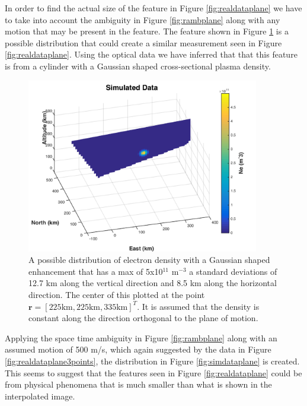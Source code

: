In order to find the actual size of the feature in Figure \ref{fig:realdataplane} we have to take into account the ambiguity in Figure \ref{fig:rambplane} along with any motion that may be present in the feature. The feature shown in Figure \ref{fig:simdataplaneorig} is a possible distribution that could create a similar measurement seen in Figure  \ref{fig:realdataplane}. Using the optical data we have inferred that that this feature is from a cylinder with a Gaussian shaped cross-sectional plasma density. 

\begin{figure}[h!]
	\centering
	\includegraphics[width=4in]{simdataplaneorig}
	\caption{A possible distribution of electron density with a Gaussian shaped enhancement that has a max of 5x10$^{11}$ m$^{-3}$  a standard deviations of 12.7 km along the vertical direction and 8.5 km along the horizontal direction. The center of this plotted at the point $\mathbf{r}=[ 225\text{km}, 225 \text{km},335\text{km}]^T$. It is assumed that the density is constant along the direction orthogonal to the plane of motion.}
	\label{fig:simdataplaneorig}
\end{figure}

Applying the space time ambiguity in Figure \ref{fig:rambplane} along with an assumed motion of 500 m/s, which again suggested by the data in Figure \ref{fig:realdataplane3points}, the distribution in Figure \ref{fig:simdataplane} is created. This seems to suggest that the features seen in Figure \ref{fig:realdataplane} could be from physical phenomena that is much smaller than what is shown in the interpolated image. 


